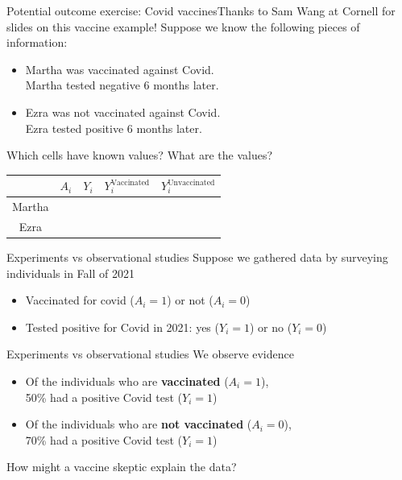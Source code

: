 \documentclass{beamer}
\begin{document}
\begin{frame}{Potential outcome exercise: Covid vaccines}{Thanks to Sam Wang at Cornell for slides on this vaccine example!} \pause
Suppose we know the following pieces of information:
{\small
\begin{itemize}
\item Martha was vaccinated against Covid.\\Martha tested negative 6 months later.
\item Ezra was not vaccinated against Covid.\\Ezra tested positive 6 months later.
\end{itemize} \pause
Which cells have known values? What are the values?
}

\begin{table}
  \renewcommand*{\arraystretch}{2}
\begin{tabular}[t]{c|c|c| c|c}
  & $A_i$ & $Y_i$ & $Y_i^{\text{Vaccinated}}$ & $Y_i^{\text{Unvaccinated}}$\\
\hline
Martha & \qquad \qquad \qquad & \qquad \qquad \qquad & \qquad & \qquad\\ \hline
Ezra & \qquad \qquad & \qquad \qquad & \qquad & \qquad\\
\end{tabular}
\end{table}

\end{frame}

\begin{frame}{Experiments vs observational studies}
Suppose we gathered data by surveying individuals in Fall of 2021
    \begin{itemize}
        \item Vaccinated for covid ($A_i = 1$) or not ($A_i = 0$)
        \item Tested positive for Covid in 2021: yes ($Y_i = 1$) or no ($Y_i=0$)
     \end{itemize}
\end{frame}

\begin{frame}{Experiments vs observational studies}
We observe evidence
     \begin{itemize}
         \item Of the individuals who are \textbf{vaccinated} ($A_i = 1$),\\50\% had a positive Covid test ($Y_i = 1$)
         \item Of the individuals who are \textbf{not vaccinated} ($A_i = 0$),\\70\% had a positive Covid test ($Y_i = 1$) 
\end{itemize} \pause
How might a vaccine skeptic explain the data? 
\end{frame}
\end{document}
